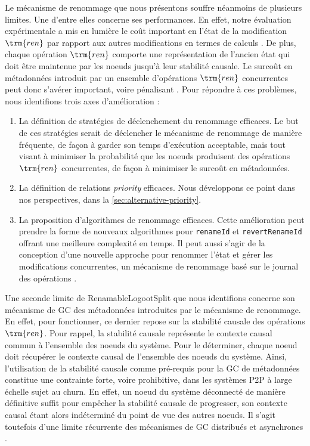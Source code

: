 Le mécanisme de renommage que nous présentons souffre néanmoins de plusieurs limites.
Une d'entre elles concerne ses performances.
En effet, notre évaluation expérimentale a mis en lumière le coût important en l'état de la modification $\trm{ren}$ par rapport aux autres modifications en termes de calculs .
De plus, chaque opération $\trm{ren}$ comporte une représentation de l'ancien état qui doit être maintenue par les noeuds jusqu'à leur stabilité causale.
Le surcoût en métadonnées introduit par un ensemble d'opérations $\trm{ren}$ concurrentes peut donc s'avérer important, voire pénalisant .
Pour répondre à ces problèmes, nous identifions trois axes d'amélioration :
\begin{enumerate}
    \item La définition de stratégies de déclenchement du renommage efficaces.
        Le but de ces stratégies serait de déclencher le mécanisme de renommage de manière fréquente, de façon à garder son temps d'exécution acceptable, mais tout visant à minimiser la probabilité que les noeuds produisent des opérations $\trm{ren}$ concurrentes, de façon à minimiser le surcoût en métadonnées.
    \item La définition de relations \emph{priority} efficaces.
        Nous développons ce point dans nos perspectives, \ie dans la \autoref{sec:alternative-priority}.
    \item La proposition d'algorithmes de renommage efficaces.
        Cette amélioration peut prendre la forme de nouveaux algorithmes pour \texttt{renameId} et \texttt{revertRenameId} offrant une meilleure complexité en temps.
        Il peut aussi s'agir de la conception d'une nouvelle approche pour renommer l'état et gérer les modifications concurrentes, \eg un mécanisme de renommage basé sur le journal des opérations .
\end{enumerate}

Une seconde limite de RenamableLogootSplit que nous identifions concerne son mécanisme de \ac{GC} des métadonnées introduites par le mécanisme de renommage.
En effet, pour fonctionner, ce dernier repose sur la stabilité causale des opérations $\trm{ren}$.
Pour rappel, la stabilité causale représente le contexte causal commun à l'ensemble des noeuds du système.
Pour le déterminer, chaque noeud doit récupérer le contexte causal de l'ensemble des noeuds du système.
Ainsi, l'utilisation de la stabilité causale comme pré-requis pour la \ac{GC} de métadonnées constitue une contrainte forte, voire prohibitive, dans les systèmes \ac{P2P} à large échelle sujet au churn.
En effet, un noeud du système déconnecté de manière définitive suffit pour empêcher la stabilité causale de progresser, son contexte causal étant alors indéterminé du point de vue des autres noeuds.
Il s'agit toutefois d'une limite récurrente des mécanismes de \ac{GC} distribués et asynchrones \cite{ROH2011354,baquero2017pure,2018-prunable-authenticated-log-vic}.

